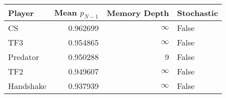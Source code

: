 \begin{tabular}{lrrl}
\toprule
    Player &  Mean $p_{N-1}$ &  Memory Depth & Stochastic \\
\midrule
        CS &        0.962699 &            \(\infty\) &      False \\
       TF3 &        0.954865 &            \(\infty\) &      False \\
  Predator &        0.950288 &             9 &      False \\
       TF2 &        0.949607 &            \(\infty\) &      False \\
 Handshake &        0.937939 &            \(\infty\) &      False \\
\bottomrule
\end{tabular}
